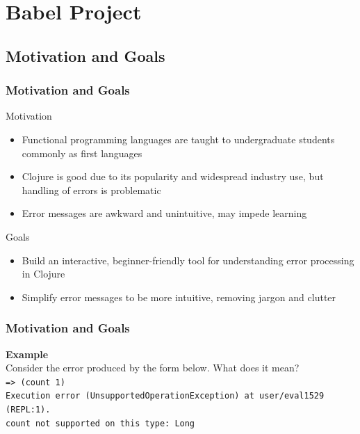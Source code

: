 \documentclass{beamer}
\begin{document}
\section{Babel Project}
\subsection{Motivation and Goals}

\begin{frame}
    \frametitle{Motivation and Goals}
    Motivation
    \begin{itemize}
        \item Functional programming languages are taught to undergraduate students commonly as first languages
        \item Clojure is good due to its popularity and widespread industry use, but handling of errors is problematic
        \item Error messages are awkward and unintuitive, may impede learning
    \end{itemize}
    Goals
    \begin{itemize}
        \item Build an interactive, beginner-friendly tool for understanding error processing in Clojure
        \item Simplify error messages to be more intuitive, removing jargon and clutter
    \end{itemize}
\end{frame}

\begin{frame}
    \frametitle{Motivation and Goals}
    \textbf{Example} \\
    Consider the error produced by the form below. What does it mean? \\
    \texttt{=> (count 1)} \\
    \texttt{Execution error (UnsupportedOperationException) at user/eval1529 (REPL:1).} \\
    \texttt{count not supported on this type: Long} \\
\end{frame}
\end{document}
